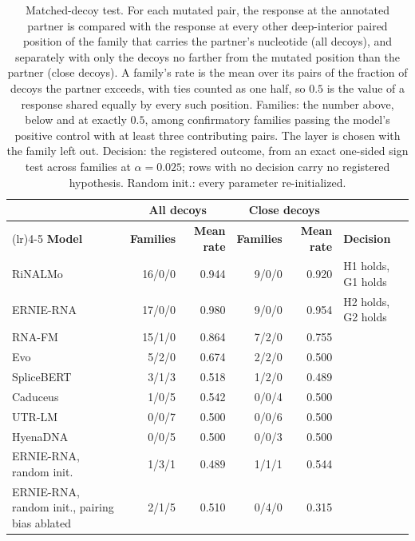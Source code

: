 \begin{table}[htbp]
\centering
\caption{Matched-decoy test. For each mutated pair, the response at the annotated partner is compared with the response at every other deep-interior paired position of the family that carries the partner's nucleotide (all decoys), and separately with only the decoys no farther from the mutated position than the partner (close decoys). A family's rate is the mean over its pairs of the fraction of decoys the partner exceeds, with ties counted as one half, so $0.5$ is the value of a response shared equally by every such position. Families: the number above, below and at exactly $0.5$, among confirmatory families passing the model's positive control with at least three contributing pairs. The layer is chosen with the family left out. Decision: the registered outcome, from an exact one-sided sign test across families at $\alpha = 0.025$; rows with no decision carry no registered hypothesis. Random init.: every parameter re-initialized.}
\label{tab:decoy}
\small
\begin{tabular}{@{}>{\raggedright\arraybackslash}p{3.6cm}rrrrl@{}}
\toprule
 & \multicolumn{2}{c}{\textbf{All decoys}} & \multicolumn{2}{c}{\textbf{Close decoys}} & \\
\cmidrule(lr){2-3}\cmidrule(lr){4-5}
\textbf{Model} & \textbf{Families} & \textbf{Mean rate} & \textbf{Families} & \textbf{Mean rate} & \textbf{Decision} \\
\midrule
RiNALMo & 16/0/0 & 0.944 & 9/0/0 & 0.920 & H1 holds, G1 holds \\
ERNIE-RNA & 17/0/0 & 0.980 & 9/0/0 & 0.954 & H2 holds, G2 holds \\
RNA-FM & 15/1/0 & 0.864 & 7/2/0 & 0.755 &  \\
Evo & 5/2/0 & 0.674 & 2/2/0 & 0.500 &  \\
SpliceBERT & 3/1/3 & 0.518 & 1/2/0 & 0.489 &  \\
Caduceus & 1/0/5 & 0.542 & 0/0/4 & 0.500 &  \\
UTR-LM & 0/0/7 & 0.500 & 0/0/6 & 0.500 &  \\
HyenaDNA & 0/0/5 & 0.500 & 0/0/3 & 0.500 &  \\
\midrule
ERNIE-RNA, random init. & 1/3/1 & 0.489 & 1/1/1 & 0.544 &  \\
ERNIE-RNA, random init., pairing bias ablated & 2/1/5 & 0.510 & 0/4/0 & 0.315 &  \\
\bottomrule
\end{tabular}
\end{table}
